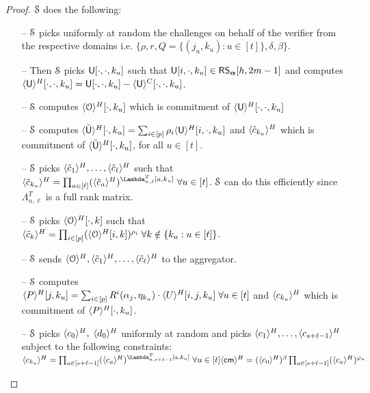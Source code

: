 \begin{proof}
	$\mathcal{S}$ does the following: 
	\begin{itemize}
		\item[--] $\mathcal{S}$ picks uniformly at random the challenges on behalf of the verifier from the respective domains i.e. $\{\rho, r, Q=\{(j_u,k_u):u\in[t]\}, \delta, \beta\}$.
		\item[--] Then $\mathcal{S}$ picks $\mathsf{U}[\cdot,\cdot,k_u]$ such that $\mathsf{U}[i,\cdot, k_u] \in \mathsf{RS}_{\bm{\alpha}}[h,2m-1]$ and computes $\langle{\mathsf{U}}\rangle^H[\cdot, \cdot, k_u] = \mathsf{U}[\cdot,\cdot, k_u] - \langle{\mathsf{U}}\rangle^C[\cdot, \cdot,k_u]$.
		\item[--] $\mathcal{S}$ computes $\langle{\mathcal{O}}\rangle^H[\cdot,k_u]$ which is commitment of $\langle{\mathsf{U}}\rangle^H[\cdot, \cdot, k_u]$
		\item[--] $\mathcal{S}$ computes $\langle{\tilde{\mathsf{U}}}\rangle^H[\cdot,k_u] = \sum_{i \in [p]} \rho_i\langle{\mathsf{U}}\rangle^H[i,\cdot,k_u]$ and $\langle{\tilde{c}_{k_u}}\rangle^H$ which is commitment of $\langle{\tilde{\mathsf{U}}}\rangle^H[\cdot,k_u]$, for all $u\in[t]$.
		\item[--] $\mathcal{S}$ picks $\langle{\tilde{c}_1}\rangle^H,\ldots,\langle{\tilde{c}_{\ell}}\rangle^H$ such that\\
		$\honshr{\tilde{c}_{k_u}} = \prod_{a\in[\ell]} (\honshr{\tilde{c}_{a}})^{\Lambda_{n,\ell}^T[a,k_u]} \; \forall u\in[t]$. $\mathcal{S}$ can do this efficiently since $\Lambda_{n,\ell}^T$ is a full rank matrix.
		\item[--] $\mathcal{S}$ picks $\langle{\mathcal{O}}\rangle^H[\cdot,k]$ such that\\
		$\langle{\tilde{c}_k}\rangle^H = \prod_{i\in[p]} (\langle{\mathcal{O}}\rangle^H[i,k])^{\rho_i} \; \forall k\notin \{k_u:u\in[t]\}$. 
		\item[--] $\mathcal{S}$ sends $\langle{\mathcal{O}}\rangle^H, \langle{\tilde{c}_{1}}\rangle^H, \ldots, \langle{\tilde{c}_{\ell}}\rangle^H$ to the aggregator.
		\item[--] $\mathcal{S}$ computes\\
		$\langle{P}\rangle^H[j,k_u] = \sum_{i\in[p]} R^i(\alpha_j, \eta_{k_u})\cdot \langle{U}\rangle^H[i,j,k_u] \; \forall u\in[t]$ and $\langle{c_{k_u}}\rangle^H$ which is commitment of $\langle{P}\rangle^H[\cdot,k_u]$.
		\item[--] $\mathcal{S}$ picks $\langle{c_0}\rangle^H,\;\langle{d_0}\rangle^H$ uniformly at random and picks $\langle{c_1}\rangle^H, \ldots, \langle{c_{s+\ell-1}}\rangle^H$ subject to the following constraints:\\
		$\honshr{c_{k_u}} = \prod_{a\in[s+\ell-1]}(\honshr{c_a})^{\Lambda_{n,s+\ell-1}^T[a,k_u]} \; \forall u\in[t]\\
		\honshr{\cm} = (\honshr{c_0})^{\beta}\prod_{a\in[s+\ell-1]} (\honshr{c_a})^{\varphi_a}$\\

\end{itemize}
\end{proof}
